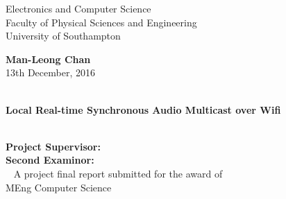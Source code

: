 \begin{center}
Electronics and Computer Science \\
Faculty of Physical Sciences and Engineering \\
University of Southampton \\
\end{center}

\begin{center}
\large
\textbf{Man-Leong Chan}\\
\normalsize
13th December, 2016\\ \
\newline
\newline
\end{center}

\begin{center}

\LARGE
\textbf{Local Real-time Synchronous Audio Multicast over Wifi}\\ \
\newline
\newline
\newline
\newline
\newline
\newline
\end{center}

\begin{center}

\textbf{Project Supervisor: } \supervisor{}\\
\textbf{Second Examinor: } \secondexaminor{}\\ \
\newline
\newline
A project final report submitted for the award of \\
MEng Computer Science
\end{center}